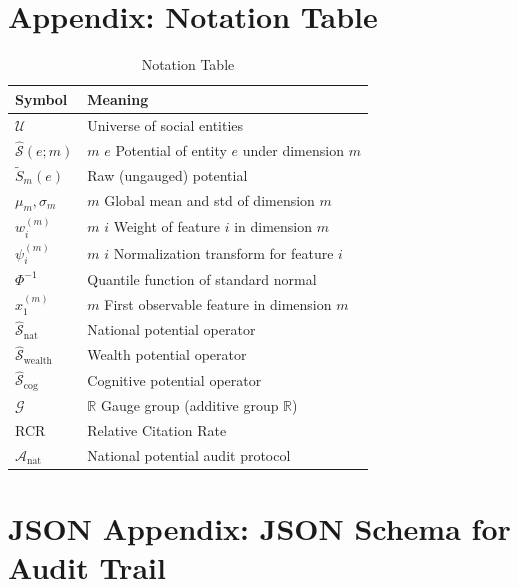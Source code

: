 \documentclass[11pt,a4paper]{article}
\theoremstyle{definition}
\newcommand{\Sop}{\hat{\mathcal{S}}}
\newcommand{\Sopnat}{\hat{\mathcal{S}}_{\text{nat}}}
\newcommand{\Sopwealth}{\hat{\mathcal{S}}_{\text{wealth}}}
\newcommand{\Sopcog}{\hat{\mathcal{S}}_{\text{cog}}}
\newcommand{\R}{\mathbb{R}}
\newcommand{\universe}{\mathcal{U}}
\newcommand{\gaugegroup}{\mathcal{G}}
\begin{document}
\appendix
\section{ Appendix: Notation Table}

\begin{table}[htbp]
\centering
\caption{ Notation Table}
\label{tab:notation}
\begin{tabular}{@{}ll@{}}
\toprule
\textbf{ Symbol} & \textbf{ Meaning} \\
\midrule
$\universe$ &  Universe of social entities \\
$\Sop(e; m)$ &  $m$  $e$  Potential of entity $e$ under dimension $m$ \\
$\tilde{S}_m(e)$ &  Raw (ungauged) potential \\
$\mu_m, \sigma_m$ &  $m$  Global mean and std of dimension $m$ \\
$w_i^{(m)}$ &  $m$  $i$  Weight of feature $i$ in dimension $m$ \\
$\psi_i^{(m)}$ &  $m$  $i$  Normalization transform for feature $i$ \\
$\Phi^{-1}$ &  Quantile function of standard normal \\
$x_1^{(m)}$ &  $m$  First observable feature in dimension $m$ \\
$\Sopnat$ &  National potential operator \\
$\Sopwealth$ &  Wealth potential operator \\
$\Sopcog$ &  Cognitive potential operator \\
$\gaugegroup$ &  $\R$ Gauge group (additive group $\R$) \\
RCR &  Relative Citation Rate \\
$\mathcal{A}_{\text{nat}}$ &  National potential audit protocol \\
\bottomrule
\end{tabular}
\end{table}

\section{JSON Appendix: JSON Schema for Audit Trail}
\end{document}
